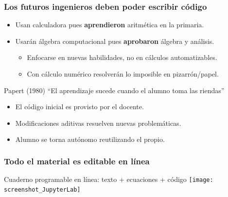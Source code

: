 \documentclass[aspectratio=43]{beamer}
\begin{document}
\begin{frame}
	\frametitle{Los futuros ingenieros deben poder escribir código}
	\pause
	\begin{block}{}
		\begin{itemize}[<+->]
			\item Usan calculadora pues \textbf{aprendieron} aritmética en la primaria.
			\item Usarán álgebra computacional pues \textbf{aprobaron} álgebra y análisis.
			\begin{itemize}[<+->]
				\item Enfocarse en nuevas habilidades, no en cálculos automatizables.
				\item Con cálculo numérico resolverán lo imposible en pizarrón/papel.
			\end{itemize}
			\end{itemize}
	\end{block}
	\pause
	\begin{block}{}
		Papert (1980) ``El aprendizaje sucede cuando el alumno toma las riendas''
		\begin{itemize}[<+->]
			\item El código inicial es provisto por el docente.
			\item Modificaciones aditivas resuelven nuevas problemáticas.
			\item Alumno se torna autónomo reutilizando el propio.
		\end{itemize}
	\end{block}
\end{frame}


\begin{frame}
	\frametitle{Todo el material es editable en línea}
	\pause
	\begin{block}{Cuaderno programable en línea: texto + ecuaciones + código}
		\texttt{[image: screenshot\_JupyterLab]}
	\end{block}
\end{frame}
\end{document}
